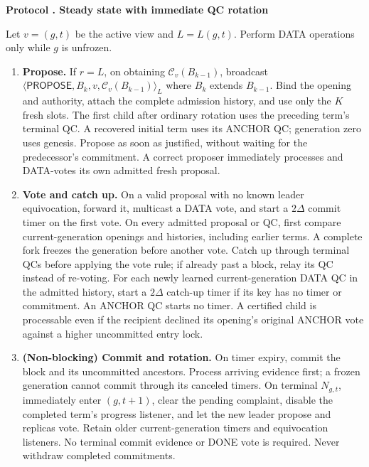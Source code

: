 \documentclass[11pt,a4paper]{article}
\newcommand{\RR}[1]{{\color{rrRed}#1}}
\newcommand{\QC}{\mathcal C}
\newcommand{\tagg}[1]{\mathsf{#1}}
\newcounter{protocol}
\newenvironment{protocol}[2]{\refstepcounter{protocol}\label{#1}
\begin{mdframed}[nobreak=true,linewidth=.6pt,skipabove=8pt,skipbelow=8pt,
innertopmargin=7pt,innerbottommargin=7pt]\small
\textbf{Protocol \theprotocol. #2}\par\smallskip}{\end{mdframed}}
\begin{document}
\begin{protocol}{alg:steady}{Steady state with immediate QC rotation}
Let $v=(g,t)$ be the active view and $L=L(g,t)$.
\RR{Perform DATA operations only while $g$ is unfrozen.}
\begin{enumerate}[label=\textbf{\arabic*)},itemsep=5pt]
\item \textbf{Propose.} If $r=L$, on obtaining $\QC_v(B_{k-1})$,
broadcast $\langle\tagg{PROPOSE},B_k,v,\QC_v(B_{k-1})\rangle_L$
where $B_k$ extends $B_{k-1}$.
\RR{Bind the opening and authority, attach the complete admission history,
and use only the $K$ fresh slots. The first child after ordinary rotation
uses the preceding term's terminal QC. A recovered initial term uses its
ANCHOR QC; generation zero uses genesis. Propose as soon as justified,
without waiting for the predecessor's commitment. A correct proposer
immediately processes and DATA-votes its own admitted fresh proposal.}
\item \textbf{Vote and catch up.} On a valid proposal with no known leader
equivocation, forward it, multicast a DATA vote, and start a $2\Delta$
commit timer on the first vote.
\RR{On every admitted proposal or QC, first compare current-generation openings and
histories, including earlier terms. A complete fork freezes the generation
before another vote. Catch up through terminal QCs before applying the
vote rule; if already past a block, relay its QC instead of re-voting.
For each newly learned current-generation DATA QC in the admitted history,
start a $2\Delta$ catch-up timer if its key has no timer or commitment.
An ANCHOR QC starts no timer. A certified child is processable even if the
recipient declined its opening's original ANCHOR vote against a higher
uncommitted entry lock.}
\item \textbf{(Non-blocking) Commit and rotation.} On timer expiry, commit
the block and its uncommitted ancestors.
\RR{Process arriving evidence first; a frozen generation cannot commit
through its canceled timers. On terminal $N_{g,t}$, immediately enter
$(g,t+1)$, clear the pending complaint, disable the completed term's
progress listener, and let the new leader propose and replicas vote.
Retain older current-generation timers and equivocation listeners.
No terminal commit evidence or DONE vote is required. Never withdraw
completed commitments.}
\end{enumerate}
\end{protocol}
\end{document}
